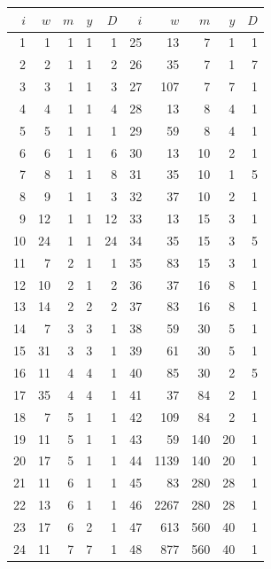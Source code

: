 \begin{center}\small
\begin{tabular}{rrrrr@{\qquad}rrrrr}
\toprule
$i$&$w$&$m$&$y$&$D$&$i$&$w$&$m$&$y$&$D$\\
\midrule
1&1&1&1&1&25&13&7&1&1\\
2&2&1&1&2&26&35&7&1&7\\
3&3&1&1&3&27&107&7&7&1\\
4&4&1&1&4&28&13&8&4&1\\
5&5&1&1&1&29&59&8&4&1\\
6&6&1&1&6&30&13&10&2&1\\
7&8&1&1&8&31&35&10&1&5\\
8&9&1&1&3&32&37&10&2&1\\
9&12&1&1&12&33&13&15&3&1\\
10&24&1&1&24&34&35&15&3&5\\
11&7&2&1&1&35&83&15&3&1\\
12&10&2&1&2&36&37&16&8&1\\
13&14&2&2&2&37&83&16&8&1\\
14&7&3&3&1&38&59&30&5&1\\
15&31&3&3&1&39&61&30&5&1\\
16&11&4&4&1&40&85&30&2&5\\
17&35&4&4&1&41&37&84&2&1\\
18&7&5&1&1&42&109&84&2&1\\
19&11&5&1&1&43&59&140&20&1\\
20&17&5&1&1&44&1139&140&20&1\\
21&11&6&1&1&45&83&280&28&1\\
22&13&6&1&1&46&2267&280&28&1\\
23&17&6&2&1&47&613&560&40&1\\
24&11&7&7&1&48&877&560&40&1\\
\bottomrule
\end{tabular}
\end{center}
